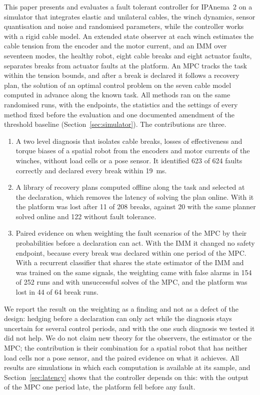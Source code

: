 \documentclass[a4paper,fleqn]{cas-dc}
\begin{document}
This paper presents and evaluates a fault tolerant controller for IPAnema~2 on a simulator that integrates elastic and unilateral cables, the winch dynamics, sensor quantisation and noise and randomised parameters, while the controller works with a rigid cable model. An extended state observer at each winch estimates the cable tension from the encoder and the motor current, and an IMM over seventeen modes, the healthy robot, eight cable breaks and eight actuator faults, separates breaks from actuator faults at the platform. An MPC tracks the task within the tension bounds, and after a break is declared it follows a recovery plan, the solution of an optimal control problem on the seven cable model computed in advance along the known task. All methods ran on the same randomised runs, with the endpoints, the statistics and the settings of every method fixed before the evaluation and one documented amendment of the threshold baseline (Section~\ref{sec:simulator}). The contributions are three.
\begin{enumerate}
\item A two level diagnosis that isolates cable breaks, losses of effectiveness and torque biases of a spatial robot from the encoders and motor currents of the winches, without load cells or a pose sensor. It identified 623 of 624 faults correctly and declared every break within 19~ms.
\item A library of recovery plans computed offline along the task and selected at the declaration, which removes the latency of solving the plan online. With it the platform was lost after 11 of 208 breaks, against 20 with the same planner solved online and 122 without fault tolerance.
\item Paired evidence on when weighting the fault scenarios of the MPC by their probabilities before a declaration can act. With the IMM it changed no safety endpoint, because every break was declared within one period of the MPC. With a recurrent classifier that shares the state estimator of the IMM and was trained on the same signals, the weighting came with false alarms in 154 of 252 runs and with unsuccessful solves of the MPC, and the platform was lost in 44 of 64 break runs.
\end{enumerate}
We report the result on the weighting as a finding and not as a defect of the design: hedging before a declaration can only act while the diagnosis stays uncertain for several control periods, and with the one such diagnosis we tested it did not help. We do not claim new theory for the observers, the estimator or the MPC; the contribution is their combination for a spatial robot that has neither load cells nor a pose sensor, and the paired evidence on what it achieves. All results are simulations in which each computation is available at its sample, and Section~\ref{sec:latency} shows that the controller depends on this: with the output of the MPC one period late, the platform fell before any fault.
\end{document}
